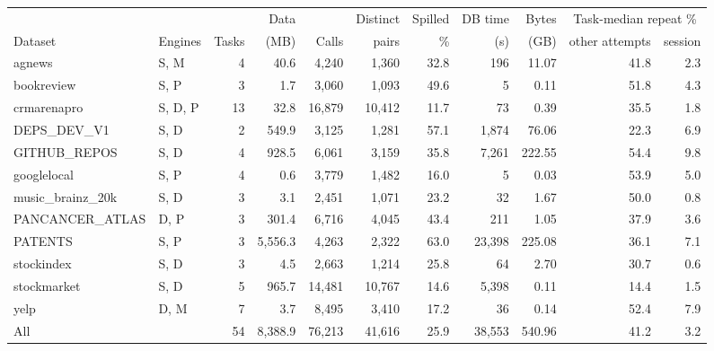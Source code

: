 \begin{tabular}{@{}llrrrrrrrrr@{}}
\toprule
 & & & Data & & Distinct & Spilled & DB time & Bytes & \multicolumn{2}{c}{Task-median repeat \%} \\ \cmidrule(l){10-11}
Dataset & Engines & Tasks & (MB) & Calls & pairs & \% & (s) & (GB) & other attempts & session \\
\midrule
agnews & S, M & 4 & 40.6 & 4,240 & 1,360 & 32.8 & 196 & 11.07 & 41.8 & 2.3 \\
bookreview & S, P & 3 & 1.7 & 3,060 & 1,093 & 49.6 & 5 & 0.11 & 51.8 & 4.3 \\
crmarenapro & S, D, P & 13 & 32.8 & 16,879 & 10,412 & 11.7 & 73 & 0.39 & 35.5 & 1.8 \\
DEPS\_DEV\_V1 & S, D & 2 & 549.9 & 3,125 & 1,281 & 57.1 & 1,874 & 76.06 & 22.3 & 6.9 \\
GITHUB\_REPOS & S, D & 4 & 928.5 & 6,061 & 3,159 & 35.8 & 7,261 & 222.55 & 54.4 & 9.8 \\
googlelocal & S, P & 4 & 0.6 & 3,779 & 1,482 & 16.0 & 5 & 0.03 & 53.9 & 5.0 \\
music\_brainz\_20k & S, D & 3 & 3.1 & 2,451 & 1,071 & 23.2 & 32 & 1.67 & 50.0 & 0.8 \\
PANCANCER\_ATLAS & D, P & 3 & 301.4 & 6,716 & 4,045 & 43.4 & 211 & 1.05 & 37.9 & 3.6 \\
PATENTS & S, P & 3 & 5,556.3 & 4,263 & 2,322 & 63.0 & 23,398 & 225.08 & 36.1 & 7.1 \\
stockindex & S, D & 3 & 4.5 & 2,663 & 1,214 & 25.8 & 64 & 2.70 & 30.7 & 0.6 \\
stockmarket & S, D & 5 & 965.7 & 14,481 & 10,767 & 14.6 & 5,398 & 0.11 & 14.4 & 1.5 \\
yelp & D, M & 7 & 3.7 & 8,495 & 3,410 & 17.2 & 36 & 0.14 & 52.4 & 7.9 \\
\midrule
All &  & 54 & 8,388.9 & 76,213 & 41,616 & 25.9 & 38,553 & 540.96 & 41.2 & 3.2 \\
\bottomrule
\end{tabular}
